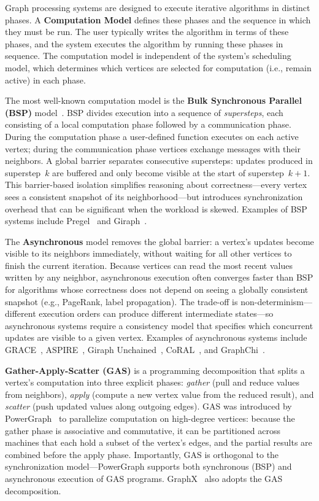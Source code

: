 Graph processing systems are designed to execute iterative algorithms in distinct phases.
A \textbf{Computation Model} defines these phases and the sequence in which they must be run.
The user typically writes the algorithm in terms of these phases, and the system executes the algorithm by running these phases in sequence.
The computation model is independent of the system's scheduling model, which determines which vertices are selected for computation (i.e., remain active) in each phase.

The most well-known computation model is the \textbf{Bulk Synchronous Parallel (BSP)} model~\cite{valiant1990bridging}.
BSP divides execution into a sequence of \emph{supersteps}, each consisting of a local computation phase followed by a communication phase.
During the computation phase a user-defined function executes on each active vertex; during the communication phase vertices exchange messages with their neighbors.
A global barrier separates consecutive supersteps: updates produced in superstep~$k$ are buffered and only become visible at the start of superstep~$k{+}1$.
This barrier-based isolation simplifies reasoning about correctness---every vertex sees a consistent snapshot of its neighborhood---but introduces synchronization overhead that can be significant when the workload is skewed.
Examples of BSP systems include Pregel~\cite{malewicz2010pregel} and Giraph~\cite{giraph}.

The \textbf{Asynchronous} model removes the global barrier: a vertex's updates become visible to its neighbors immediately, without waiting for all other vertices to finish the current iteration.
Because vertices can read the most recent values written by any neighbor, asynchronous execution often converges faster than BSP for algorithms whose correctness does not depend on seeing a globally consistent snapshot (e.g., PageRank, label propagation).
The trade-off is non-determinism---different execution orders can produce different intermediate states---so asynchronous systems require a consistency model that specifies which concurrent updates are visible to a given vertex.
Examples of asynchronous systems include GRACE~\cite{wang2013asynchronous}, ASPIRE~\cite{vora2014aspire}, Giraph Unchained~\cite{han2015giraph}, CoRAL~\cite{vora2017coral}, and GraphChi~\cite{kyrola2012graphchi}.

\textbf{Gather-Apply-Scatter (GAS)} is a programming decomposition that splits a vertex's computation into three explicit phases: \emph{gather} (pull and reduce values from neighbors), \emph{apply} (compute a new vertex value from the reduced result), and \emph{scatter} (push updated values along outgoing edges).
GAS was introduced by PowerGraph~\cite{gonzalez2012powergraph} to parallelize computation on high-degree vertices: because the gather phase is associative and commutative, it can be partitioned across machines that each hold a subset of the vertex's edges, and the partial results are combined before the apply phase.
Importantly, GAS is orthogonal to the synchronization model---PowerGraph supports both synchronous (BSP) and asynchronous execution of GAS programs.
GraphX~\cite{gonzalez2014graphx} also adopts the GAS decomposition.

